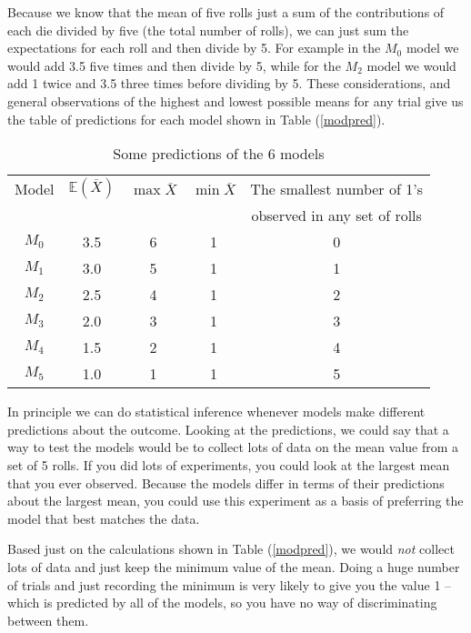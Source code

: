 \documentclass[11pt]{article}
\begin{document}
Because we know that the mean of five rolls just a sum of the contributions of each die divided by five (the total number of rolls), we can just sum the expectations for each roll and then divide by 5.
For example in the $M_0$ model we would add  3.5 five times and then divide by 5, while for the $M_2$ model we would add 1 twice and 3.5 three times before dividing by 5.
These considerations, and general observations of the highest and lowest possible means for any trial give us the  table of predictions for  each model shown in Table (\ref{modpred}).
\begin{table}[htdp]
\caption{Some predictions of the 6 models}\label{modpred}
\begin{center}
\begin{tabular}{|c|c|c|c|c|}
Model & $ \mathbb E(\overline{X})$ & $\max \overline{X}$ & $\min \overline{X}$ & The smallest number of 1's\\
 &  &  &  & observed in any set of rolls\\
\hline 
$M_0$ & 3.5 & 6 & 1 & 0\\
$M_1$ & 3.0 & 5 & 1 & 1\\
$M_2$ & 2.5 & 4 & 1 & 2\\
$M_3$ & 2.0 & 3 & 1 & 3\\
$M_4$ & 1.5 & 2 & 1 & 4\\
$M_5$ & 1.0 & 1 & 1 & 5\\
\hline 
\end{tabular}
\end{center}
\label{default}
\end{table}%

In principle we  can do statistical inference whenever models make different predictions about the outcome.
Looking at the predictions, we could say that a way to test the models would be to collect lots of data on the mean value from a set of 5 rolls.  If you did lots of experiments, you could look at the largest mean that you ever observed.
Because the models differ in terms of their predictions about the largest mean, you could use this experiment as a basis of preferring the model that best matches the data. 

Based just on the calculations shown in Table (\ref{modpred}), we would  {\em not} collect lots of data and just keep the minimum value of the mean.  Doing a huge number of trials and just recording the minimum is very likely to give you the value 1 -- which is predicted by all of the models, so you have no way of discriminating between them.
\end{document}

